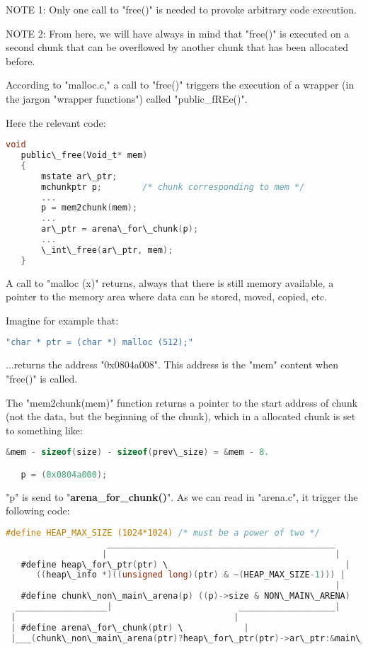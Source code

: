 \documentclass[12pt]{article}
\begin{document}
NOTE 1: Only one call to "free()" is needed to provoke arbitrary code
        execution.
\newline


NOTE 2: From here, we will have always in mind that "free()" is executed
        on a second chunk that can be overflowed by another chunk that
        has been allocated before.
\newline


According to "malloc.c," a call to "free()" triggers the execution of a
wrapper (in the jargon "wrapper functions") called "public\_fREe()".
\newline


Here the relevant code:
\begin{lstlisting}[language=C]
   void
   public\_free(Void_t* mem)
   {
       mstate ar\_ptr;
       mchunkptr p;        /* chunk corresponding to mem */
       ...
       p = mem2chunk(mem);
       ...
       ar\_ptr = arena\_for\_chunk(p);
       ...
       \_int\_free(ar\_ptr, mem);
   }
\end{lstlisting}



A call to "malloc (x)" returns, always that there is still memory
available, a pointer to the memory area where data can be stored, moved,
copied, etc.
\newline


Imagine for example that:
\begin{lstlisting}[language=C]
   "char * ptr = (char *) malloc (512);"
\end{lstlisting}
...returns the address "0x0804a008". This address is the "mem" content
when  "free()" is called.
\newline


The "mem2chunk(mem)" function returns a pointer to the start address of
chunk (not the data, but the beginning of the chunk), which in a allocated
chunk is set to something like:
\begin{lstlisting}[language=C]
   &mem - sizeof(size) - sizeof(prev\_size) = &mem - 8.

   p = (0x0804a000);
\end{lstlisting}
"p" is send to "\textbf{arena\_for\_chunk()}". As we can read in "arena.c", it
trigger the following code:
\newline


\begin{lstlisting}[language=C]
   #define HEAP_MAX_SIZE (1024*1024) /* must be a power of two */
                    _____________________________________________
                   |                                             |
   #define heap\_for\_ptr(ptr) \                                   |
      ((heap\_info *)((unsigned long)(ptr) & ~(HEAP_MAX_SIZE-1))) |
                                                                 |
   #define chunk\_non\_main\_arena(p) ((p)->size & NON\_MAIN\_ARENA)  |
  __________________|                         ___________________|
 |                                           |
 | #define arena\_for\_chunk(ptr) \            |
 |___(chunk\_non\_main\_arena(ptr)?heap\_for\_ptr(ptr)->ar\_ptr:&main\_arena)

\end{lstlisting}
\end{document}
